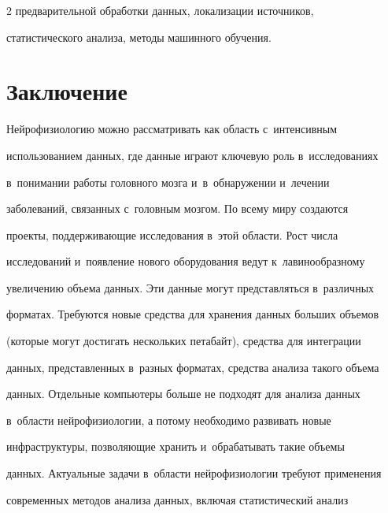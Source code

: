 \begin{multicols}{2}
предварительной обработки данных, локализации источников, 


статистического анализа, методы машинного обучения.





\vspace*{-6pt}





\section{Заключение}





 \vspace*{-3pt}





    Нейрофизиологию можно рассматривать как область с~интенсивным 


использованием данных, где данные играют ключевую роль в~исследованиях 


в~понимании работы головного мозга и~в~обнаружении и~лечении 


заболеваний, связанных с~головным мозгом. По всему миру создаются 


проекты, поддерживающие исследования в~этой области. Рост числа 


исследований и~появление нового оборудования ведут к~лавинообразному 


увеличению объема данных. Эти данные могут представляться в~различных 


форматах. Требуются новые средства для хранения данных больших объемов 


(которые могут достигать нескольких петабайт), средства для интеграции 


данных, представленных в~разных форматах, средства анализа такого объема 


данных. Отдельные компьютеры больше не подходят для анализа данных 


в~области нейрофизиологии, а потому необходимо развивать новые 


инфраструктуры, позволяющие хранить и~обрабатывать такие объемы 


данных. Актуальные задачи в~области нейрофизиологии требуют применения 


современных методов анализа данных, включая статистический анализ 



\end{multicols}
